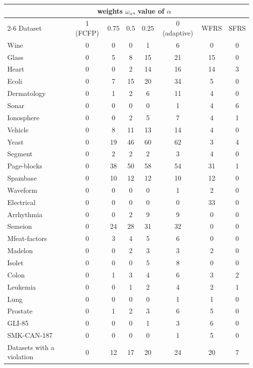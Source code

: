 \begin{minipage}{\linewidth}
\centering
{}
\label{tab:mono}
\footnotesize
\setlength{\tabcolsep}{3pt}
\begin{tabular}{@{}lccccccc@{}}
\toprule
 & \multicolumn{5}{c}{weights $\omega_\alpha$, value of $\alpha$} & & \\ \cmidrule(lr){2-6}
Dataset & 1 (FCFP) & $0.75$ & $0.5$ & $0.25$ & 0 (adaptive) & WFRS & SFRS \\
\midrule
Wine & 0 & 0 & 0 & 1 & 6 & 0 & 0 \\
Glass & 0 & 5 & 8 & 15 & 21 & 15 & 0 \\
Heart & 0 & 0 & 2 & 14 & 16 & 14 & 3 \\
Ecoli & 0 & 7 & 15 & 20 & 34 & 5 & 0 \\
Dermatology & 0 & 1 & 2 & 6 & 11 & 4 & 0 \\
Sonar & 0 & 0 & 0 & 0 & 1 & 4 & 6 \\
Ionosphere & 0 & 0 & 2 & 5 & 7 & 4 & 1 \\
\midrule
Vehicle & 0 & 8 & 11 & 13 & 14 & 4 & 0 \\
Yeast & 0 & 19 & 46 & 60 & 62 & 3 & 4 \\
Segment & 0 & 2 & 2 & 2 & 3 & 4 & 0 \\
Page-blocks & 0 & 38 & 50 & 58 & 54 & 31 & 1 \\
\midrule
Spambase & 0 & 10 & 12 & 12 & 10 & 12 & 0 \\
Waveform & 0 & 0 & 0 & 0 & 1 & 2 & 0 \\
Electrical & 0 & 0 & 0 & 0 & 0 & 33 & 0 \\
\midrule
Arrhythmia & 0 & 0 & 2 & 9 & 9 & 0 & 0 \\
Semeion & 0 & 24 & 28 & 31 & 32 & 0 & 0 \\
Mfeat-factors & 0 & 3 & 4 & 5 & 6 & 0 & 0 \\
Madelon & 0 & 0 & 2 & 3 & 3 & 2 & 0 \\
Isolet & 0 & 0 & 0 & 5 & 8 & 0 & 0 \\
\midrule
Colon & 0 & 1 & 3 & 4 & 6 & 3 & 2 \\
Leukemia & 0 & 0 & 1 & 2 & 4 & 2 & 1 \\
Lung & 0 & 0 & 0 & 0 & 1 & 1 & 0 \\
Prostate & 0 & 1 & 2 & 3 & 6 & 5 & 0 \\
GLI-85 & 0 & 0 & 0 & 1 & 3 & 6 & 0 \\
SMK-CAN-187 & 0 & 0 & 0 & 0 & 1 & 5 & 0 \\
\midrule
Datasets with a violation & 0 & 12 & 17 & 20 & 24 & 20 & 7 \\
\bottomrule
\end{tabular}
\end{minipage}\par
